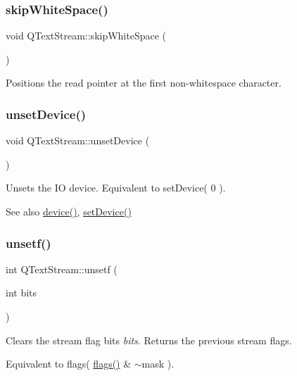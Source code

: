 \subsubsection{\texorpdfstring{skipWhiteSpace()}{skipWhiteSpace()}}
{\footnotesize\ttfamily void Q\+Text\+Stream\+::skip\+White\+Space (\begin{DoxyParamCaption}{ }\end{DoxyParamCaption})}

Positions the read pointer at the first non-\/whitespace character. \mbox{\label{class_q_text_stream_a6d8aeebd7f4b1cc9f2dce27f6a0d9bd9}} 
\subsubsection{\texorpdfstring{unsetDevice()}{unsetDevice()}}
{\footnotesize\ttfamily void Q\+Text\+Stream\+::unset\+Device (\begin{DoxyParamCaption}{ }\end{DoxyParamCaption})}

Unsets the IO device. Equivalent to set\+Device( 0 ). \begin{DoxySeeAlso}{See also}
\mbox{\hyperlink{class_q_text_stream_a50f5712b3231e41af256c5faadf69512}{device()}}, \mbox{\hyperlink{class_q_text_stream_a20bb0f4064d19330d4ed6bb56299fba7}{set\+Device()}} 
\end{DoxySeeAlso}
\mbox{\label{class_q_text_stream_a7f7cb71e79749c7d13217dec5599e627}} 
\subsubsection{\texorpdfstring{unsetf()}{unsetf()}}
{\footnotesize\ttfamily int Q\+Text\+Stream\+::unsetf (\begin{DoxyParamCaption}\item[{int}]{bits }\end{DoxyParamCaption})\hspace{0.3cm}{\ttfamily [inline]}}

Clears the stream flag bits {\itshape bits}. Returns the previous stream flags.

Equivalent to {\ttfamily flags( \mbox{\hyperlink{class_q_text_stream_ab6cf395446ba04973dff067ab8b36978}{flags()}} \& $\sim$mask )}.

